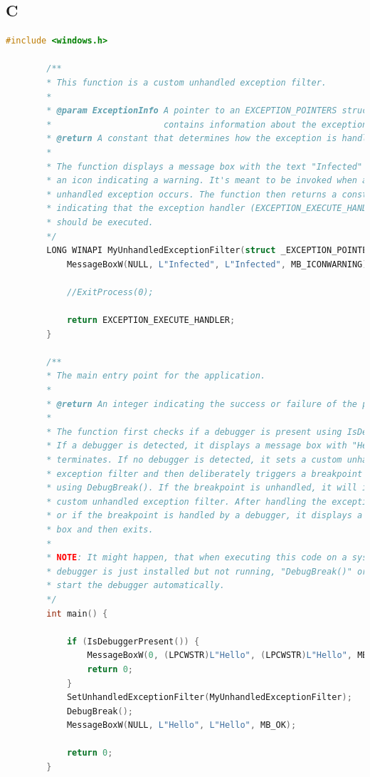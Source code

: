 \documentclass{article}
\begin{document}
	\subsection*{C}
	\begin{lstlisting}[language=c]
		#include <windows.h>
		
		/**
		* This function is a custom unhandled exception filter.
		*
		* @param ExceptionInfo A pointer to an EXCEPTION_POINTERS structure that
		*                      contains information about the exception.
		* @return A constant that determines how the exception is handled.
		*
		* The function displays a message box with the text "Infected" and
		* an icon indicating a warning. It's meant to be invoked when an
		* unhandled exception occurs. The function then returns a constant
		* indicating that the exception handler (EXCEPTION_EXECUTE_HANDLER)
		* should be executed.
		*/
		LONG WINAPI MyUnhandledExceptionFilter(struct _EXCEPTION_POINTERS* ExceptionInfo) {
			MessageBoxW(NULL, L"Infected", L"Infected", MB_ICONWARNING);
			
			//ExitProcess(0);
			
			return EXCEPTION_EXECUTE_HANDLER;
		}
		
		/**
		* The main entry point for the application.
		*
		* @return An integer indicating the success or failure of the program.
		*
		* The function first checks if a debugger is present using IsDebuggerPresent().
		* If a debugger is detected, it displays a message box with "Hello" and then
		* terminates. If no debugger is detected, it sets a custom unhandled
		* exception filter and then deliberately triggers a breakpoint exception
		* using DebugBreak(). If the breakpoint is unhandled, it will invoke the
		* custom unhandled exception filter. After handling the exception,
		* or if the breakpoint is handled by a debugger, it displays a "Hello" message
		* box and then exits.
		* 
		* NOTE: It might happen, that when executing this code on a system where a
		* debugger is just installed but not running, "DebugBreak()" or "INT 3" might
		* start the debugger automatically.
		*/
		int main() {
			
			if (IsDebuggerPresent()) {
				MessageBoxW(0, (LPCWSTR)L"Hello", (LPCWSTR)L"Hello", MB_OK);
				return 0;
			}
			SetUnhandledExceptionFilter(MyUnhandledExceptionFilter);
			DebugBreak();
			MessageBoxW(NULL, L"Hello", L"Hello", MB_OK);
			
			return 0;
		}
		
	\end{lstlisting}
	
\end{document}
